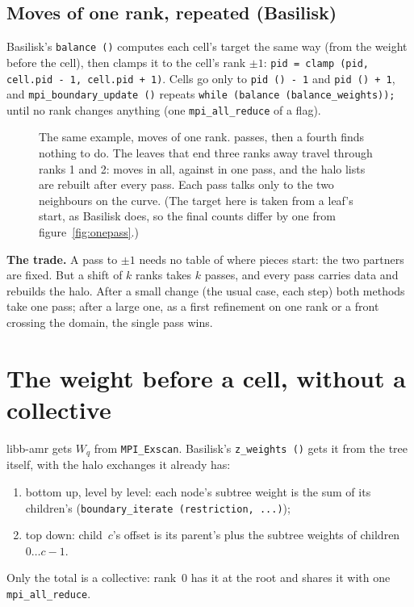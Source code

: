\documentclass[10pt,a4paper]{article}
\theoremstyle{definition}
\newcommand{\fn}[1]{\texttt{#1}}
\begin{document}
\subsection{Moves of one rank, repeated (Basilisk)}

Basilisk's \fn{balance ()} computes each cell's target the same way (from
the weight before the cell), then clamps it to the cell's rank $\pm 1$:
\fn{pid = clamp (pid, cell.pid - 1, cell.pid + 1)}. Cells go only to
\fn{pid () - 1} and \fn{pid () + 1}, and \fn{mpi\_boundary\_update ()}
repeats \fn{while (balance (balance\_weights));} until no rank changes
anything (one \fn{mpi\_all\_reduce} of a flag).

\begin{figure}[h]
  \centering
  \begin{tikzpicture}\end{tikzpicture}
  \caption{The same example, moves of one rank. \npasses{} passes, then a
    fourth finds nothing to do. The leaves that end three ranks away
    travel through ranks 1 and 2: \moveditr{} moves in all, against
    \movedonce{} in one pass, and the halo lists are rebuilt after every
    pass. Each pass talks only to the two neighbours on the curve. (The
    target here is taken from a leaf's start, as Basilisk does, so the
    final counts differ by one from figure~\ref{fig:onepass}.)}
  \label{fig:iterate}
\end{figure}

\textbf{The trade.} A pass to $\pm 1$ needs no table of where pieces
start: the two partners are fixed. But a shift of $k$ ranks takes $k$
passes, and every pass carries data and rebuilds the halo. After a small
change (the usual case, each step) both methods take one pass; after a
large one, as a first refinement on one rank or a front crossing the
domain, the single pass wins.

\section{The weight before a cell, without a collective}

libb-amr gets $W_q$ from \fn{MPI\_Exscan}. Basilisk's \fn{z\_weights ()}
gets it from the tree itself, with the halo exchanges it already has:
\begin{enumerate}
  \item bottom up, level by level: each node's subtree weight is the sum
    of its children's (\fn{boundary\_iterate (restriction, ...)});
  \item top down: child~$c$'s offset is its parent's plus the subtree
    weights of children $0 \ldots c-1$.
\end{enumerate}
Only the total is a collective: rank~0 has it at the root and shares it
with one \fn{mpi\_all\_reduce}.
\end{document}

